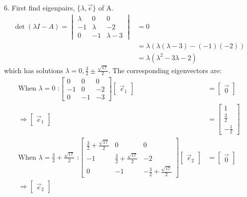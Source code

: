 \documentclass[11pt]{homework}
\begin{document}
6. First find eigenpairs, $\{\lambda, \vec e\}$ of A.
\begin{align*}
\det (\lambda I - A) =
  \begin{vmatrix}
    \lambda & 0 & 0 \\
    -1      & \lambda & -2 \\
    0 & -1  & \lambda - 3 
  \end{vmatrix}
  &= 0 \\
  &= \lambda ( \lambda (\lambda-3) - (-1)(-2)) \\
  &= \lambda ( \lambda^2 - 3 \lambda - 2)
\end{align*}
which has solutions $\lambda = 0, \frac{3}{2}\pm\frac{\sqrt{17}}{2}$.
The corresponding eigenvectors are:
\begin{align*}
\text{When $\lambda = 0$ :}
  \begin{bmatrix}
    0 & 0 & 0 \\
    -1 & 0 & -2 \\
    0 & -1 & -3
  \end{bmatrix}
  \begin{bmatrix}
    \vec e_1
  \end{bmatrix}
  &=
  \begin{bmatrix}
    \vec 0
  \end{bmatrix} \\
\Rightarrow
  \begin{bmatrix}
    \vec e_1
  \end{bmatrix}
  &=
  \begin{bmatrix}
    1 \\
    \frac{3}{2} \\
    -\frac{1}{2}
  \end{bmatrix} \\
\text{When $\lambda = \frac{3}{2} + \frac{\sqrt{17}}{2}$ :}
  \begin{bmatrix}
    \frac{3}{2} + \frac{\sqrt{17}}{2} & 0 & 0 \\
    -1 &  \frac{3}{2} + \frac{\sqrt{17}}{2} & -2 \\
    0  & -1 & -\frac{3}{2} + \frac{\sqrt{17}}{2}
  \end{bmatrix}
  \begin{bmatrix}
    \vec e_2
  \end{bmatrix}
  &=
  \begin{bmatrix}
    \vec 0
  \end{bmatrix} \\
\Rightarrow
  \begin{bmatrix}
    \vec e_2
  \end{bmatrix}

\end{align*}
\end{document}

